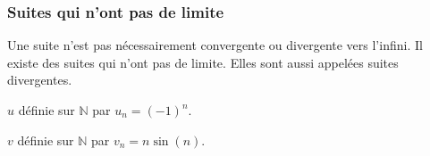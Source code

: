 \documentclass[french]{book}
\newcommand{\N}{\mathbb {N}}
\newcommand{\limn}{\lim_{n\rightarrow +\infty}}
\newcommand{\limpinf}[1][x]{\ds\lim_{#1\rightarrow +\infty}}
\begin{document}
\subsubsection*{Suites qui n'ont pas de limite}
Une suite n'est pas nécessairement convergente ou divergente vers l'infini. Il existe des suites qui n'ont pas de limite. Elles sont aussi appelées suites divergentes.

\begin{exemple}
$u$ définie sur $\N$ par $u_{n}=(-1)^{n}$.

$v$ définie sur $\N$ par $v_{n}=n\sin(n)$.
\end{exemple}

\end{document}
